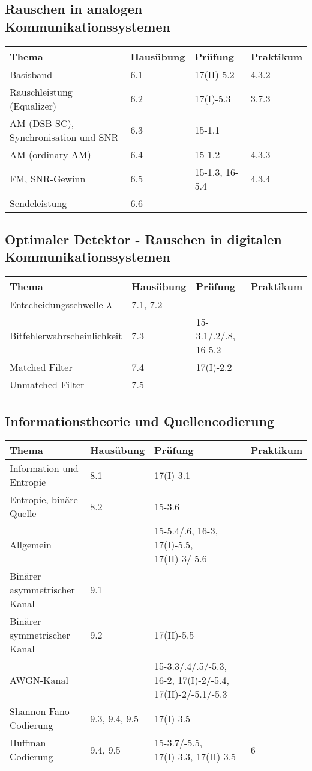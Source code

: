 \subsection{Rauschen in analogen Kommunikationssystemen}
	\begin{tabular}{|p{9cm}|p{2.5cm}|p{3.9cm}|p{1.6cm}|}
	\hline
	\textbf{Thema} & \textbf{Hausübung} & \textbf{Prüfung} & \textbf{Praktikum} \\ 
	\hline
	\hline
	Basisband & 6.1 & 17(II)-5.2& 4.3.2\\
	\hline
	Rauschleistung (Equalizer) & 6.2 & 17(I)-5.3& 3.7.3\\
	\hline
	AM (DSB-SC), Synchronisation und SNR & 6.3 & 15-1.1& \\
	\hline
	AM (ordinary AM) & 6.4 & 15-1.2& 4.3.3\\
	\hline
	FM, SNR-Gewinn & 6.5 & 15-1.3, 16-5.4& 4.3.4\\
	\hline
	Sendeleistung & 6.6 & & \\
	\hline
	\end{tabular}
\subsection{Optimaler Detektor - Rauschen in digitalen Kommunikationssystemen}
	\begin{tabular}{|p{9cm}|p{2.5cm}|p{3.9cm}|p{1.6cm}|}
	\hline
	\textbf{Thema} & \textbf{Hausübung} & \textbf{Prüfung} & \textbf{Praktikum} \\ 
	\hline
	\hline
	Entscheidungsschwelle $\lambda$ & 7.1, 7.2 & & \\
	\hline
	Bitfehlerwahrscheinlichkeit & 7.3 & 15-3.1/.2/.8, 16-5.2& \\
	\hline
	Matched Filter & 7.4 & 17(I)-2.2& \\
	\hline
	Unmatched Filter & 7.5 & & \\
	\hline
	\end{tabular}
\subsection{Informationstheorie und Quellencodierung}
	\begin{tabular}{|p{9cm}|p{2.5cm}|p{3.9cm}|p{1.6cm}|}
	\hline
	\textbf{Thema} & \textbf{Hausübung} & \textbf{Prüfung} & \textbf{Praktikum} \\ 
	\hline
	\hline
	Information und Entropie & 8.1 & 17(I)-3.1& \\
	\hline
	Entropie, binäre Quelle & 8.2 & 15-3.6 & \\
	\hline
	Allgemein & & 15-5.4/.6, 16-3, 17(I)-5.5, 17(II)-3/-5.6&\\
	\hline
	Binärer asymmetrischer Kanal & 9.1 & & \\
	\hline
	Binärer symmetrischer Kanal & 9.2 & 17(II)-5.5& \\
	\hline
	AWGN-Kanal & & 15-3.3/.4/.5/-5.3, 16-2, 17(I)-2/-5.4, 17(II)-2/-5.1/-5.3& \\
	\hline
	Shannon Fano Codierung & 9.3, 9.4, 9.5 & 17(I)-3.5 & \\
	\hline
	Huffman Codierung & 9.4, 9.5 & 15-3.7/-5.5, 17(I)-3.3, 17(II)-3.5& 6\\
	\hline
	\end{tabular}
